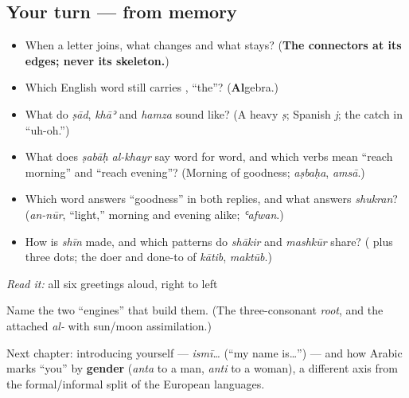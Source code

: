\subsection*{Your turn — from memory}
\begin{itemize}
\raggedright
  \item When a letter joins, what changes and what stays? (\textbf{The connectors at its edges; never its skeleton.})
  \item Which English word still carries \textbf{}, \textquotedblleft{}the\textquotedblright{}? (\textbf{Al}gebra.)
  \item What do \emph{ṣād}, \emph{khāʾ} and \emph{hamza} sound like? (A heavy \emph{ṣ}; Spanish \emph{j}; the catch in \textquotedblleft{}uh-oh.\textquotedblright{})
  \item What does \emph{ṣabāḥ al-khayr} say word for word, and which verbs mean \textquotedblleft{}reach morning\textquotedblright{} and \textquotedblleft{}reach evening\textquotedblright{}? (Morning of goodness; \emph{aṣbaḥa}, \emph{amsā}.)
  \item Which word answers \textquotedblleft{}goodness\textquotedblright{} in both replies, and what answers \emph{shukran}? (\emph{an-nūr}, \textquotedblleft{}light,\textquotedblright{} morning and evening alike; \emph{ʿafwan}.)
  \item How is \emph{shīn} made, and which patterns do \emph{shākir} and \emph{mashkūr} share? (\textbf{} plus three dots; the doer and done-to of \emph{kātib}, \emph{maktūb}.)
\end{itemize}

\begin{tcolorbox}[breakable,colback=teal!4,colframe=teal!35!black,title={Before you move on}]
\emph{Read it:} all six greetings aloud, right to left

Name the two \textquotedblleft{}engines\textquotedblright{} that build them. (The three-consonant \emph{root}, and the attached \emph{al-} with sun/moon assimilation.)

Next chapter: introducing yourself — \emph{ismī…} (\textquotedblleft{}my name is…\textquotedblright{}) — and how Arabic marks \textquotedblleft{}you\textquotedblright{} by \textbf{gender} (\emph{anta} to a man, \emph{anti} to a woman), a different axis from the formal/informal split of the European languages.
\end{tcolorbox}
